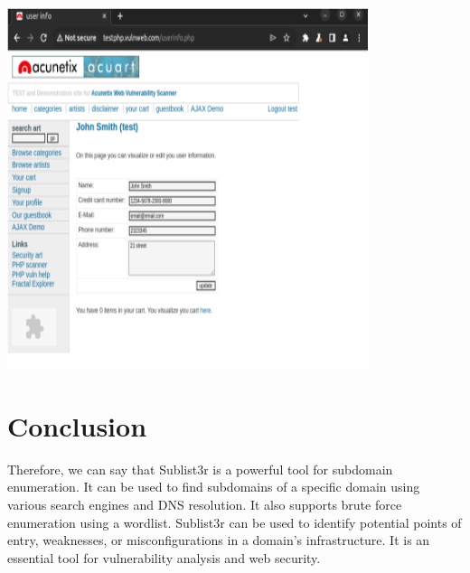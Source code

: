 \documentclass[12pt]{article}
\begin{document}
\begin{center}
    \includegraphics[max width=\textwidth]{Image16.png}
\end{center}

\section{Conclusion}\label{sec:conclusion}
Therefore, we can say that Sublist3r is a powerful tool for subdomain enumeration. It can be used to find subdomains of a specific domain using various search engines and DNS resolution. It also supports brute force enumeration using a wordlist. Sublist3r can be used to identify potential points of entry, weaknesses, or misconfigurations in a domain's infrastructure. It is an essential tool for vulnerability analysis and web security.
\end{document}
